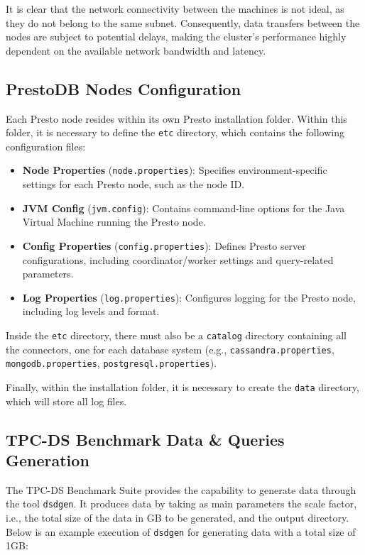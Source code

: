 \documentclass[conference]{IEEEtran}
\begin{document}
It is clear that the network connectivity between the machines is not ideal, as they do not belong to the same subnet. Consequently, data transfers between the nodes are subject to potential delays, making the cluster's performance highly dependent on the available network bandwidth and latency.

\subsection{PrestoDB Nodes Configuration}

Each Presto node resides within its own Presto installation folder. Within this folder, it is necessary to define the \texttt{etc} directory, which contains the following configuration files:

\begin{itemize}
    \item \textbf{Node Properties} (\texttt{node.properties}): Specifies environment-specific settings for each Presto node, such as the node ID.
    \item \textbf{JVM Config} (\texttt{jvm.config}): Contains command-line options for the Java Virtual Machine running the Presto node.
    \item \textbf{Config Properties} (\texttt{config.properties}): Defines Presto server configurations, including coordinator/worker settings and query-related parameters.

    \item \textbf{Log Properties} (\texttt{log.properties}): Configures logging for the Presto node, including log levels and format.
\end{itemize}


Inside the \texttt{etc} directory, there must also be a \texttt{catalog} directory containing all the connectors, one for each database system (e.g., \texttt{cassandra.properties}, \texttt{mongodb.properties}, \texttt{postgresql.properties}).

Finally, within the installation folder, it is necessary to create the \texttt{data} directory, which will store all log files.


\subsection{TPC-DS Benchmark Data \& Queries Generation}

The TPC-DS Benchmark Suite provides the capability to generate data through the tool \texttt{dsdgen}. It produces data by taking as main parameters the scale factor, i.e., the total size of the data in GB to be generated, and the output directory. Below is an example execution of \texttt{dsdgen} for generating data with a total size of 1GB:
\end{document}

